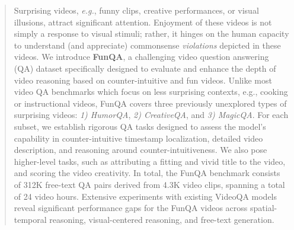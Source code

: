 \begin{abstract}
Surprising videos, \emph{e.g.}, funny clips, creative performances, or visual illusions, attract significant attention. Enjoyment of these videos is not simply a response to visual stimuli; rather, it hinges on the human capacity to understand (and appreciate) commonsense \emph{violations} depicted in these videos.
We introduce \textbf{FunQA}, a challenging video question answering (QA) dataset specifically designed to evaluate and enhance the depth of video reasoning based on counter-intuitive and fun videos. Unlike most video QA benchmarks which focus on less surprising contexts, e.g., cooking or instructional videos, FunQA covers three previously unexplored types of surprising videos: \emph{1) HumorQA}, \emph{2) CreativeQA}, and \emph{3) MagicQA}.
For each subset, we establish rigorous QA tasks designed to assess the model's capability in counter-intuitive timestamp localization, detailed video description, and reasoning around counter-intuitiveness.
We also pose higher-level tasks, such as attributing a fitting and vivid title to the video, and scoring the video creativity.
In total, the FunQA benchmark consists of 312K free-text QA pairs derived from 4.3K video clips, spanning a total of 24 video hours.
Extensive experiments with existing VideoQA models reveal significant performance gaps for the FunQA videos across spatial-temporal reasoning, visual-centered reasoning, and free-text generation.
 \end{abstract}


